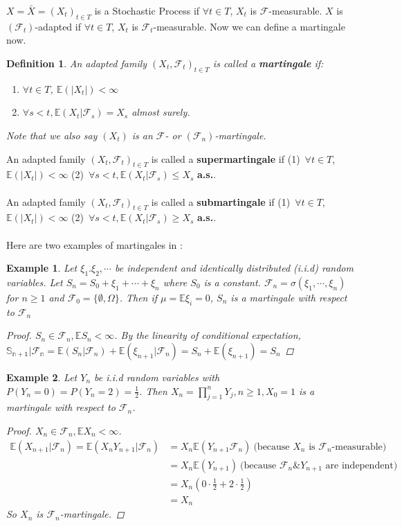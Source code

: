 \documentclass[10pt]{article}
\newtheorem{example}{Example}
\newtheorem{definition}{Definition}
\begin{document}
$X=\bar{X}=(X_t)_{t \in T}$ is a Stochastic Process if $\forall t \in T$, $X_t$ is $\mathcal{F}$-measurable. $X$ is $(\mathcal{F}_t)$-adapted if $\forall t \in T$, $X_t$ is $\mathcal{F}_t$-measurable. Now we can define a martingale now.
\begin{definition}
An adapted family $(X_t, \mathcal{F}_t)_{t \in T}$ is called a \textbf{martingale} if:\begin{enumerate}
    \item $\forall t \in T$, $\mathbb{E}(|X_t|)<\infty$
    \item $\forall s<t, \mathbb{E}(X_t|\mathcal{F}_s)=X_s$ almost surely.
\end{enumerate}
Note that we also say $(X_t)$ is an $\mathcal{F}$- or $(\mathcal{F}_n)$-martingale.
\end{definition}
An adapted family $(X_t, \mathcal{F}_t)_{t \in T}$ is called a \textbf{supermartingale} if (1)\ $\forall t \in T$, $\mathbb{E}(|X_t|)<\infty$
(2)\ $\forall s<t, \mathbb{E}(X_t|\mathcal{F}_s)\le X_s$ \textbf{a.s.}.\\\\An adapted family $(X_t, \mathcal{F}_t)_{t \in T}$ is called a \textbf{submartingale} if (1)\ $\forall t \in T$, $\mathbb{E}(|X_t|)<\infty$
(2)\ $\forall s<t, \mathbb{E}(X_t|\mathcal{F}_s)\ge X_s$ \textbf{a.s.}.\\\\
Here are two examples of martingales in \cite{Durrett:2019}:
\begin{example}
Let $\xi_1.\xi_2, \cdots$ be independent and identically distributed (i.i.d) random variables. Let $S_n=S_0+\xi_1+\cdots+\xi_n$ where $S_0$ is a constant. $\mathcal{F}_n=\sigma(\xi_1, \cdots, \xi_n)$ for $n \ge 1$ and $\mathcal{F}_0=\{\emptyset, \Omega\}$. Then if $\mu=\mathbb{E}{\xi_i}=0$, $S_n$ is a martingale with respect to $\mathcal{F}_n$
\begin{proof}
$S_n \in \mathcal{F}_n, \mathbb{E}S_n<\infty$. By the linearity of conditional expectation, $\mathbb{S_{n+1}|\mathcal{F}_n}=\mathbb{E}(S_n|\mathcal{F}_n)+\mathbb{E}(\xi_{n+1}|\mathcal{F}_n)=S_n+\mathbb{E}(\xi_{n+1})=S_n$
\end{proof}
\end{example}
\begin{example}
Let $Y_n$ be i.i.d random variables with $P(Y_n=0)=P(Y_n=2)=\frac{1}{2}$. Then $X_n=\prod_{j=1}^{n}Y_j, n \ge 1, X_0=1$ is a martingale with respect to $\mathcal{F}_n$.
\begin{proof}
$X_n \in \mathcal{F}_n, \mathbb{E}X_n<\infty$.
\begin{align*}
    \mathbb{E}(X_{n+1}|\mathcal{F}_n)=\mathbb{E}(X_nY_{n+1}|\mathcal{F}_n)&=X_n\mathbb{E}(Y_{n+1}\mathcal{F}_n) \ \text{(because $X_n$ is $\mathcal{F}_n$-measurable)}\\&=X_n \mathbb{E}(Y_{n+1}) \ \text{(because $\mathcal{F}_n \& Y_{n+1}$ are independent)}\\&=X_n\left(0 \cdot \frac{1}{2}+2 \cdot \frac{1}{2}\right)\\&=X_n
\end{align*}
So $X_n$ is $\mathcal{F}_n$-martingale.
\end{proof}
\end{example}
\end{document}
